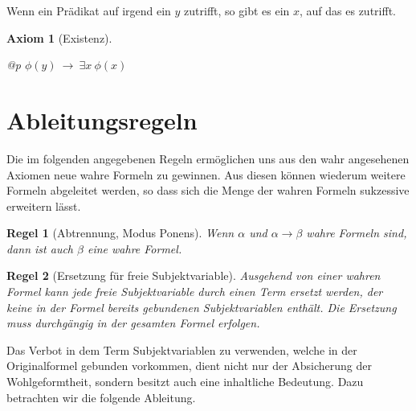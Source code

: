 \documentclass[a4paper,german,10pt,twoside]{book}
\newtheorem{ax}{Axiom}
\newtheorem{rul}{Regel}
\theoremstyle{definition}
\theoremstyle{remark}
\begin{document}
\par
Wenn ein Pr{\"a}dikat auf irgend ein $y$ zutrifft, so gibt es ein $x$, auf das es zutrifft.

\begin{ax}[Existenz]
\label{axiom:existencialGeneralization} \hypertarget{axiom:existencialGeneralization}{}
\mbox{}
\begin{longtable}{{@{\extracolsep{\fill}}p{\linewidth}}}
\centering $\phi(y)\ \rightarrow \ \exists x\ \phi(x)$
\end{longtable}

\end{ax}




\section{Ableitungsregeln} \label{chapter4_section1} \hypertarget{chapter4_section1}{}
Die im folgenden angegebenen Regeln erm{\"o}glichen uns aus den wahr angesehenen Axiomen neue wahre Formeln zu gewinnen. Aus diesen k{\"o}nnen wiederum weitere Formeln abgeleitet werden, so dass sich die Menge der wahren Formeln sukzessive erweitern l{\"a}sst.

\par


\begin{rul}[Abtrennung, Modus Ponens]
\label{rule:modusPonens} \hypertarget{rule:modusPonens}{}
Wenn $\alpha$ und $\alpha \rightarrow \beta$ wahre Formeln sind, 
dann ist auch $\beta$ eine wahre Formel.
\end{rul}




\par


\begin{rul}[Ersetzung f{\"u}r freie Subjektvariable]
\label{rule:replaceFree} \hypertarget{rule:replaceFree}{}
Ausgehend von einer wahren Formel kann jede freie Subjektvariable durch einen Term ersetzt werden, der keine in der Formel bereits gebundenen Subjektvariablen enth{\"a}lt. Die Ersetzung muss durchg{\"a}ngig in der gesamten Formel erfolgen.
\end{rul}

Das Verbot in dem Term Subjektvariablen zu verwenden, welche in der Originalformel gebunden vorkommen, dient nicht nur der Absicherung der Wohlgeformtheit, sondern besitzt auch eine inhaltliche Bedeutung. Dazu betrachten wir die folgende Ableitung.
\end{document}
